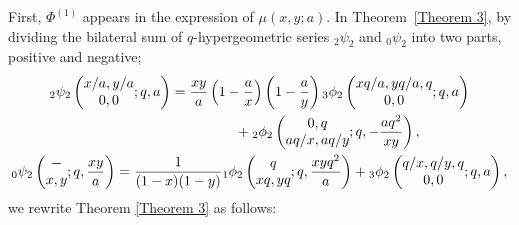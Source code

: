 \documentclass[pdftex]{sigma}
\numberwithin{equation}{section}
\theoremstyle{definition}
\begin{document}
First, $\Phi^{(1)}$ appears in the expression of $\mu(x,y;a)$.
In Theorem~\ref{Theorem 3}, by dividing the bilateral sum of $q$-hypergeometric series ${}_2\psi_2$ and ${}_0\psi_2$ into two parts, positive and negative;
\begin{gather*}
{}_2\psi_2\left(\begin{matrix}x/a,y/a\\0,0\end{matrix};q,a\right)
 =
 \frac{xy}{a}\left(1-\frac{a}{x}\right)\left(1-\frac{a}{y}\right){}_3\phi_2\left(\begin{matrix}xq/a,yq/a,q \\ 0,0 \end{matrix};q,a\right) \\
\hphantom{{}_2\psi_2\left(\begin{matrix}x/a,y/a\\0,0\end{matrix};q,a\right)=}{}
 +{}_2\phi_2\left(\begin{matrix}0,q \\ aq/x,aq/y \end{matrix};q,-\frac{aq^2}{xy}\right), \\
{}_0\psi_2\left(\begin{matrix}-\\x,y\end{matrix};q,\frac{xy}{a}\right)
 =
 \frac{1}{(1-x)(1-y)}{}_1\phi_2\left(\begin{matrix}q \\ xq,yq \end{matrix};q,\frac{xyq^2}{a}\right)
 +{}_3\phi_2\left(\begin{matrix}q/x,q/y,q \\ 0,0 \end{matrix};q,a\right),
\end{gather*}
we rewrite Theorem \ref{Theorem 3} as follows:
\end{document}

